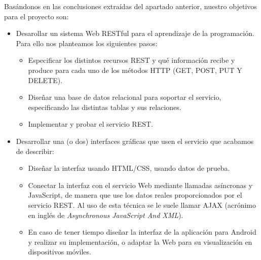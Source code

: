 Basándonos en las conclusiones extraídas del apartado anterior, nuestro objetivos para el proyecto son:

\begin{itemize}
\item
Desarollar un sistema Web RESTful para el aprendizaje de la programación. Para ello nos planteamos los siguientes pasos:

\begin{itemize}
\item
Especificar los distintos recursos REST y qué información recibe y produce para cada uno de los métodos HTTP (GET, POST, PUT Y DELETE).

\item
Diseñar una base de datos relacional para soportar el servicio, especificando las distintas tablas y sus relaciones.

\item
Implementar y probar el servicio REST.

\end{itemize}

\item
Desarrollar una (o dos) interfaces gráficas que usen el servicio que acabamos de describir:

\begin{itemize}
\item
Diseñar la interfaz usando HTML/CSS, usando datos de prueba.

\item
Conectar la interfaz con el servicio Web mediante llamadas asíncronas y JavaScript, de manera que use los datos reales proporcionados por el servicio REST. Al uso de esta técnica se le suele llamar AJAX (acrónimo en inglés de  \emph{Asynchronous JavaScript And XML}).

\item
En caso de tener tiempo diseñar la interfaz de la aplicación para Android y realizar su implementación, o adaptar la Web para su visualización en dispositivos móviles.

\end{itemize}

\end{itemize}